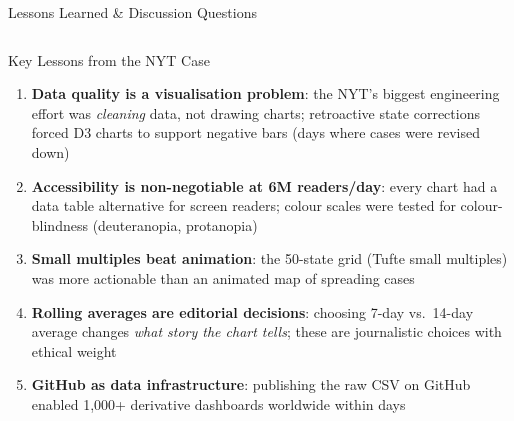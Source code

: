 \documentclass[aspectratio=169,10pt]{beamer}
\begin{document}
\begin{frame}{Lessons Learned \& Discussion Questions}
  \begin{columns}[T]
      \begin{block}{Key Lessons from the NYT Case}
        \begin{enumerate}
          \item \textbf{Data quality is a visualisation problem}:
                the NYT's biggest engineering effort was
                \emph{cleaning} data, not drawing charts;
                retroactive state corrections forced D3 charts to
                support negative bars (days where cases were revised down)
          \item \textbf{Accessibility is non-negotiable at 6M readers/day}:
                every chart had a data table alternative for
                screen readers; colour scales were tested for
                colour-blindness (deuteranopia, protanopia)
          \item \textbf{Small multiples beat animation}: the 50-state
                grid (Tufte small multiples) was more actionable than
                an animated map of spreading cases
          \item \textbf{Rolling averages are editorial decisions}:
                choosing 7-day vs.\ 14-day average changes
                \emph{what story the chart tells};
                these are journalistic choices with ethical weight
          \item \textbf{GitHub as data infrastructure}: publishing
                the raw CSV on GitHub enabled 1{,}000+ derivative
                dashboards worldwide within days
        \end{enumerate}
      \end{block}


\end{columns}
\end{frame}
\end{document}
